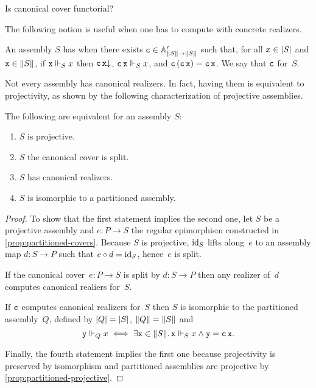 \begin{exercise}
  Is canonical cover functorial?
\end{exercise}

The following notion is useful when one has to compute with concrete realizers.

\begin{definition}
  An assembly $S$ has  when there exists $\R{c} \in \subAtyp{\T{S} \to \T{S}}$ such that, for all $x \in \S{S}$ and $\R{x} \in \T{S}$,
  if $\R{x} \rz[S] x$ then $\defined{\R{c}\,\R{x}}$, $\R{c}\,\R{x} \rz[S] x$, and $\R{c} \, (\R{c}\,\R{x}) = \R{c}\,\R{x}$. We say that $\R{c}$  for~$S$.
\end{definition}

Not every assembly has canonical realizers. In fact, having them is equivalent to projectivity, as shown by the following characterization of projective assemblies.

\begin{theorem}
  \label{thm:when-projective}%
  The following are equivalent for an assembly $S$:
  \begin{enumerate}
  \item \label{it:when-projective-1} $S$ is projective.
  \item \label{it:when-projective-2} $S$ the canonical cover is split.
  \item \label{it:when-projective-3} $S$ has canonical realizers.
  \item \label{it:when-projective-4} $S$ is isomorphic to a partitioned assembly.
  \end{enumerate}
\end{theorem}

\begin{proof}
  To show that the first statement implies the second one, let $S$ be a projective assembly and $e : P \to S$ the regular epimorphism constructed in \cref{prop:partitioned-covers}.
  Because $S$ is projective, $\id[S]$ lifts along~$e$ to an assembly map $d : S \to P$ such that $e \circ d = \id[S]$, hence~$e$ is split.

  If the canonical cover~$e : P \to S$ is split by $d : S \to P$ then any realizer of~$d$ computes canonical realiers for~$S$.

  If $\R{c}$ computes canonical realizers for~$S$ then $S$ is isomorphic to the partitioned assembly~$Q$, defined by $\S{Q} = \S{S}$, $\T{Q} = \T{S}$ and
  \begin{equation*}
    \R{y} \rz[Q] x
    \iff
    \some{\R{x} \in \T{S}} \R{x} \rz[S] x \land \R{y} = \R{c}\,\R{x}.
  \end{equation*}

  Finally, the fourth statement implies the first one because projectivity is preserved by isomorphism and partitioned assemblies are projective by \cref{prop:partitioned-projective}.
\end{proof}

